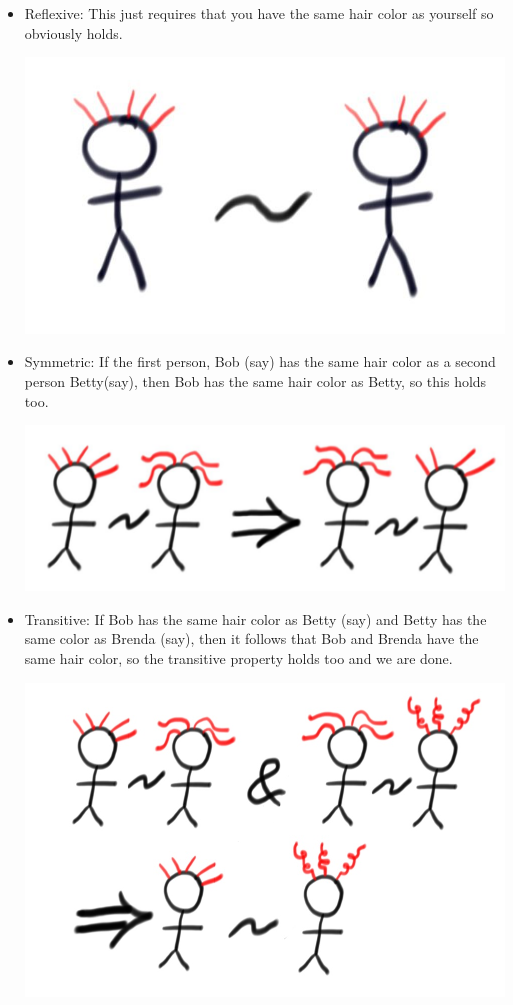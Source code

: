 {\begin{itemize}
\item Reflexive: This just requires that you have the same hair color as yourself so obviously holds.

\begin{center}
\includegraphics[scale=.15]{bobbob.jpg}
\end{center}

\item Symmetric: If the first person, Bob (say) has the same hair color as a second person Betty(say), then Bob has
the same hair color as Betty, so this holds too.

\begin{center}
\includegraphics[scale=.15]{bobbetty.jpg}
\end{center}

\item Transitive: If Bob has the same hair color as Betty (say) and Betty has the same color as Brenda (say), then it follows
that Bob and Brenda have the same hair color, so the transitive property holds too and we are done.

\begin{center}
\includegraphics[scale=.24]{bobbettybrenda.jpg}
\end{center}
\end{itemize}
}

\newpage
